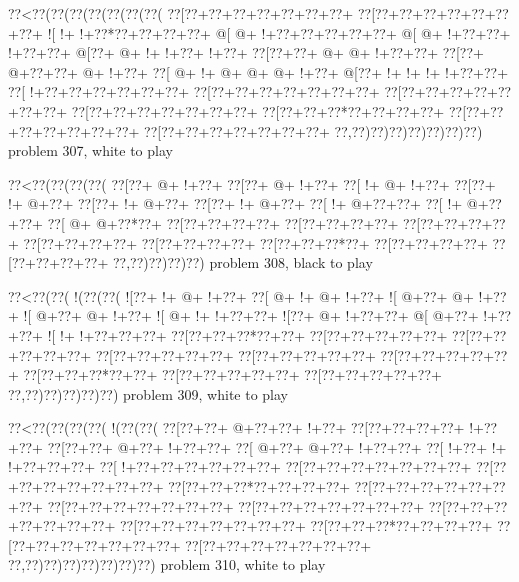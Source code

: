 \vbox{\vbox{\goo
\0??<\0??(\0??(\0??(\0??(\0??(\0??(\0??(
\0??[\0??+\0??+\0??+\0??+\0??+\0??+\0??+
\0??[\0??+\0??+\0??+\0??+\0??+\0??+\0??+
\- ![\- !+\- !+\0??*\0??+\0??+\0??+\0??+
\- @[\- @+\- !+\0??+\0??+\0??+\0??+\0??+
\- @[\- @+\- !+\0??+\0??+\- !+\0??+\0??+
\- @[\0??+\- @+\- !+\- !+\0??+\- !+\0??+
\0??[\0??+\0??+\- @+\- @+\- !+\0??+\0??+
\0??[\0??+\- @+\0??+\0??+\- @+\- !+\0??+
\0??[\- @+\- !+\- @+\- @+\- @+\- !+\0??+
\- @[\0??+\- !+\- !+\- !+\- !+\0??+\0??+
\0??[\- !+\0??+\0??+\0??+\0??+\0??+\0??+
\0??[\0??+\0??+\0??+\0??+\0??+\0??+\0??+
\0??[\0??+\0??+\0??+\0??+\0??+\0??+\0??+
\0??[\0??+\0??+\0??+\0??+\0??+\0??+\0??+
\0??[\0??+\0??+\0??*\0??+\0??+\0??+\0??+
\0??[\0??+\0??+\0??+\0??+\0??+\0??+\0??+
\0??[\0??+\0??+\0??+\0??+\0??+\0??+\0??+
\0??,\0??)\0??)\0??)\0??)\0??)\0??)\0??)
}
\hfil problem 307, white to play\hfil\break
}

\vbox{\vbox{\goo
\0??<\0??(\0??(\0??(\0??(
\0??[\0??+\- @+\- !+\0??+
\0??[\0??+\- @+\- !+\0??+
\0??[\- !+\- @+\- !+\0??+
\0??[\0??+\- !+\- @+\0??+
\0??[\0??+\- !+\- @+\0??+
\0??[\0??+\- !+\- @+\0??+
\0??[\- !+\- @+\0??+\0??+
\0??[\- !+\- @+\0??+\0??+
\0??[\- @+\- @+\0??*\0??+
\0??[\0??+\0??+\0??+\0??+
\0??[\0??+\0??+\0??+\0??+
\0??[\0??+\0??+\0??+\0??+
\0??[\0??+\0??+\0??+\0??+
\0??[\0??+\0??+\0??+\0??+
\0??[\0??+\0??+\0??*\0??+
\0??[\0??+\0??+\0??+\0??+
\0??[\0??+\0??+\0??+\0??+
\0??,\0??)\0??)\0??)\0??)
}
\hfil problem 308, black to play\hfil\break
}

\vbox{\vbox{\goo
\0??<\0??(\0??(\- !(\0??(\0??(
\- ![\0??+\- !+\- @+\- !+\0??+
\0??[\- @+\- !+\- @+\- !+\0??+
\- ![\- @+\0??+\- @+\- !+\0??+
\- ![\- @+\0??+\- @+\- !+\0??+
\- ![\- @+\- !+\- !+\0??+\0??+
\- ![\0??+\- @+\- !+\0??+\0??+
\- @[\- @+\0??+\- !+\0??+\0??+
\- ![\- !+\- !+\0??+\0??+\0??+
\0??[\0??+\0??+\0??*\0??+\0??+
\0??[\0??+\0??+\0??+\0??+\0??+
\0??[\0??+\0??+\0??+\0??+\0??+
\0??[\0??+\0??+\0??+\0??+\0??+
\0??[\0??+\0??+\0??+\0??+\0??+
\0??[\0??+\0??+\0??+\0??+\0??+
\0??[\0??+\0??+\0??*\0??+\0??+
\0??[\0??+\0??+\0??+\0??+\0??+
\0??[\0??+\0??+\0??+\0??+\0??+
\0??,\0??)\0??)\0??)\0??)\0??)
}
\hfil problem 309, white to play\hfil\break
}

\vbox{\vbox{\goo
\0??<\0??(\0??(\0??(\0??(\- !(\0??(\0??(
\0??[\0??+\0??+\- @+\0??+\0??+\- !+\0??+
\0??[\0??+\0??+\0??+\0??+\- !+\0??+\0??+
\0??[\0??+\0??+\- @+\0??+\- !+\0??+\0??+
\0??[\- @+\0??+\- @+\0??+\- !+\0??+\0??+
\0??[\- !+\0??+\- !+\- !+\0??+\0??+\0??+
\0??[\- !+\0??+\0??+\0??+\0??+\0??+\0??+
\0??[\0??+\0??+\0??+\0??+\0??+\0??+\0??+
\0??[\0??+\0??+\0??+\0??+\0??+\0??+\0??+
\0??[\0??+\0??+\0??*\0??+\0??+\0??+\0??+
\0??[\0??+\0??+\0??+\0??+\0??+\0??+\0??+
\0??[\0??+\0??+\0??+\0??+\0??+\0??+\0??+
\0??[\0??+\0??+\0??+\0??+\0??+\0??+\0??+
\0??[\0??+\0??+\0??+\0??+\0??+\0??+\0??+
\0??[\0??+\0??+\0??+\0??+\0??+\0??+\0??+
\0??[\0??+\0??+\0??*\0??+\0??+\0??+\0??+
\0??[\0??+\0??+\0??+\0??+\0??+\0??+\0??+
\0??[\0??+\0??+\0??+\0??+\0??+\0??+\0??+
\0??,\0??)\0??)\0??)\0??)\0??)\0??)\0??)
}
\hfil problem 310, white to play\hfil\break
}

